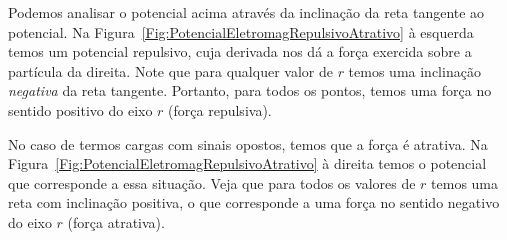 Podemos analisar o potencial acima através da inclinação da reta tangente ao potencial. Na Figura~\ref{Fig:PotencialEletromagRepulsivoAtrativo} à esquerda temos um potencial repulsivo, cuja derivada nos dá a força exercida sobre a partícula da direita. Note que para qualquer valor de $r$ temos uma inclinação \emph{negativa} da reta tangente. Portanto, para todos os pontos, temos uma força no sentido positivo do eixo $r$ (força repulsiva).

No caso de termos cargas com sinais opostos, temos que a força é atrativa. Na Figura~\ref{Fig:PotencialEletromagRepulsivoAtrativo} à direita temos o potencial que corresponde a essa situação. Veja que para todos os valores de $r$ temos uma reta com inclinação positiva, o que corresponde a uma força no sentido negativo do eixo $r$ (força atrativa).

